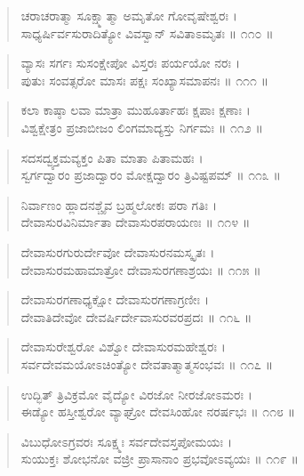 \begin{verse}
ಚರಾಚರಾತ್ಮಾ ಸೂಕ್ಷ್ಮಾತ್ಮಾ ಅಮೃತೋ ಗೋವೃಷೇಶ್ವರಃ ।\\ಸಾಧ್ಯರ್ಷಿರ್ವಸುರಾದಿತ್ಯೋ ವಿವಸ್ವಾನ್ ಸವಿತಾಽಮೃತಃ \num{॥ ೧೧೦ ॥}
\end{verse}

\begin{verse}
ವ್ಯಾಸಃ ಸರ್ಗಃ ಸುಸಂಕ್ಷೇಪೋ ವಿಸ್ತರಃ ಪರ್ಯಯೋ ನರಃ ।\\ಪುತುಃ ಸಂವತ್ಸರೋ ಮಾಸಃ ಪಕ್ಷಃ ಸಂಖ್ಯಾಸಮಾಪನಃ \num{॥ ೧೧೧ ॥}
\end{verse}

\begin{verse}
ಕಲಾ ಕಾಷ್ಠಾ ಲವಾ ಮಾತ್ರಾ ಮುಹೂರ್ತಾಹಃ ಕ್ಷಪಾಃ ಕ್ಷಣಾಃ ।\\ವಿಶ್ವಕ್ಷೇತ್ರಂ ಪ್ರಜಾಬೀಜಂ ಲಿಂಗಮಾದ್ಯಸ್ತು ನಿರ್ಗಮಃ \num{॥ ೧೧೨ ॥}
\end{verse}

\begin{verse}
ಸದಸದ್ವ್ಯಕ್ತಮವ್ಯಕ್ತಂ ಪಿತಾ ಮಾತಾ ಪಿತಾಮಹಃ ।\\ಸ್ವರ್ಗದ್ವಾರಂ ಪ್ರಜಾದ್ವಾರಂ ಮೋಕ್ಷದ್ವಾರಂ ತ್ರಿವಿಷ್ಟಪಮ್ \num{॥ ೧೧೩ ॥}
\end{verse}

\begin{verse}
ನಿರ್ವಾಣಂ ಹ್ಲಾದನಶ್ಚೈವ ಬ್ರಹ್ಮಲೋಕಃ ಪರಾ ಗತಿಃ ।\\ದೇವಾಸುರವಿನಿರ್ಮಾತಾ ದೇವಾಸುರಪರಾಯಣಃ \num{॥ ೧೧೪ ॥}
\end{verse}

\begin{verse}
ದೇವಾಸುರಗುರುರ್ದೇವೋ ದೇವಾಸುರನಮಸ್ಕೃತಃ ।\\ದೇವಾಸುರಮಹಾಮಾತ್ರೋ ದೇವಾಸುರಗಣಾಶ್ರಯಃ \num{॥ ೧೧೫ ॥}
\end{verse}

\begin{verse}
ದೇವಾಸುರಗಣಾಧ್ಯಕ್ಷೋ ದೇವಾಸುರಗಣಾಗ್ರಣೀಃ ।\\ದೇವಾತಿದೇವೋ ದೇವರ್ಷಿರ್ದೇವಾಸುರವರಪ್ರದಃ \num{॥ ೧೧೬ ॥}
\end{verse}

\begin{verse}
ದೇವಾಸುರೇಶ್ವರೋ ವಿಶ್ವೋ ದೇವಾಸುರಮಹೇಶ್ವರಃ ।\\ಸರ್ವದೇವಮಯೋಽಚಿಂತ್ಯೋ ದೇವತಾತ್ಮಾತ್ಮಸಂಭವಃ \num{॥ ೧೧೭ ॥}
\end{verse}

\begin{verse}
ಉದ್ಭಿತ್ ತ್ರಿವಿಕ್ರಮೋ ವೈದ್ಯೋ ವಿರಜೋ ನೀರಜೋಽಮರಃ ।\\ಈಡ್ಯೋ ಹಸ್ತೀಶ್ವರೋ ವ್ಯಾಘ್ರೋ ದೇವಸಿಂಹೋ ನರರ್ಷಭಃ \num{॥ ೧೧೮ ॥}
\end{verse}

\begin{verse}
ವಿಬುಧೋಽಗ್ರವರಃ ಸೂಕ್ಷ್ಮಃ ಸರ್ವದೇವಸ್ತಪೋಮಯಃ ।\\ಸುಯುಕ್ತಃ ಶೋಭನೋ ವಜ್ರೀ ಪ್ರಾಸಾನಾಂ ಪ್ರಭವೋಽವ್ಯಯಃ \num{॥ ೧೧೯ ॥}
\end{verse}

